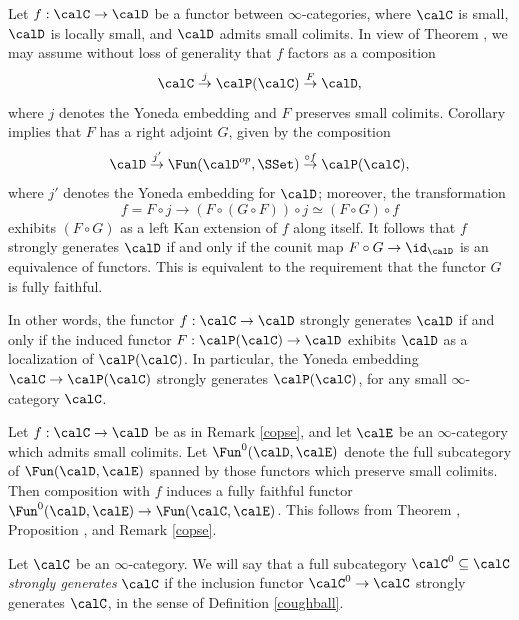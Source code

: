 \begin{remark}\label{copse}
Let $f: \calC \rightarrow \calD$ be a functor between $\infty$-categories, where $\calC$ is small, $\calD$ is locally small, and $\calD$ admits small colimits. In view of Theorem , we may assume without loss of generality that $f$ factors as a composition
$$ \calC \stackrel{j}{\rightarrow} \calP(\calC) \stackrel{F}{\rightarrow} \calD,$$
where $j$ denotes the Yoneda embedding and $F$ preserves small colimits.
Corollary  implies that $F$ has a right adjoint $G$, given by the composition
$$ \calD \stackrel{j'}{\rightarrow} \Fun( \calD^{op}, \SSet) \stackrel{\circ f}{\rightarrow} \calP(\calC),$$
where $j'$ denotes the Yoneda embedding for $\calD$; moreover, the transformation
$$ f = F \circ j \rightarrow (F \circ (G \circ F)) \circ j \simeq (F \circ G) \circ f$$
exhibits $(F \circ G)$ as a left Kan extension of $f$ along itself. It follows that $f$
strongly generates $\calD$ if and only if the counit map $F \circ G \rightarrow \id_{\calD}$ is an equivalence of functors. This is equivalent to the requirement that the functor $G$ is fully faithful.

In other words, the functor $f: \calC \rightarrow \calD$ strongly generates $\calD$ if and only if the
induced functor $F: \calP(\calC) \rightarrow \calD$ exhibits $\calD$ as a localization of
$\calP(\calC)$. In particular, the Yoneda embedding $\calC \rightarrow \calP(\calC)$
strongly generates $\calP(\calC)$, for any small $\infty$-category $\calC$.
\end{remark}

\begin{remark}\label{copo}
Let $f: \calC \rightarrow \calD$ be as in Remark \ref{copse}, and let $\calE$ be an $\infty$-category which admits small colimits. Let $\Fun^{0}(\calD, \calE)$ denote the full subcategory of
$\Fun(\calD, \calE)$ spanned by those functors which preserve small colimits. Then composition
with $f$ induces a fully faithful functor $\Fun^{0}(\calD, \calE) \rightarrow \Fun(\calC, \calE)$. 
This follows from Theorem , Proposition , and Remark \ref{copse}.
\end{remark}

\begin{definition}\label{ballcough}
Let $\calC$ be an $\infty$-category. We will say that a full subcategory $\calC^{0} \subseteq \calC$ 
{\it strongly generates} $\calC$ if the inclusion functor $\calC^{0} \rightarrow \calC$ strongly generates $\calC$, in the sense of Definition \ref{coughball}.
\end{definition}

